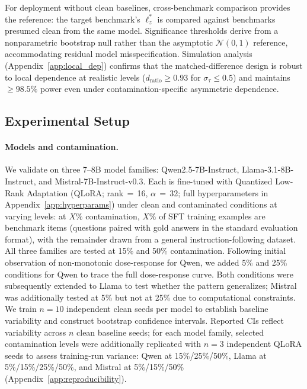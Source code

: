 For deployment without clean baselines, cross-benchmark comparison provides the reference: the target benchmark's $\ell_z^*$ is compared against benchmarks presumed clean from the same model.
Significance thresholds derive from a nonparametric bootstrap null rather than the asymptotic $\mathcal{N}(0,1)$ reference, accommodating residual model misspecification.
Simulation analysis (Appendix~\ref{app:local_dep}) confirms that the matched-difference design is robust to local dependence at realistic levels ($d_{\text{ratio}} \geq 0.93$ for $\sigma_\tau \leq 0.5$) and maintains ${\geq}98.5\%$ power even under contamination-specific asymmetric dependence.

\subsection{Experimental Setup}
\label{sec:setup}

\paragraph{Models and contamination.}
We validate on three 7--8B model families: Qwen2.5-7B-Instruct, Llama-3.1-8B-Instruct, and Mistral-7B-Instruct-v0.3.
Each is fine-tuned with Quantized Low-Rank Adaptation (QLoRA; rank\,$=$\,16, $\alpha$\,$=$\,32; full hyperparameters in Appendix~\ref{app:hyperparams}) under clean and contaminated conditions at varying levels: at $X\%$ contamination, $X\%$ of SFT training examples are benchmark items (questions paired with gold answers in the standard evaluation format), with the remainder drawn from a general instruction-following dataset.
All three families are tested at 15\% and 50\% contamination.
Following initial observation of non-monotonic dose-response for Qwen, we added 5\% and 25\% conditions for Qwen to trace the full dose-response curve.
Both conditions were subsequently extended to Llama to test whether the pattern generalizes; Mistral was additionally tested at 5\% but not at 25\% due to computational constraints.
We train $n{=}10$ independent clean seeds per model to establish baseline variability and construct bootstrap confidence intervals.
Reported CIs reflect variability across $n$ clean baseline seeds; for each model family, selected contamination levels were additionally replicated with $n{=}3$ independent QLoRA seeds to assess training-run variance: Qwen at 15\%/25\%/50\%, Llama at 5\%/15\%/25\%/50\%, and Mistral at 5\%/15\%/50\% (Appendix~\ref{app:reproducibility}).

